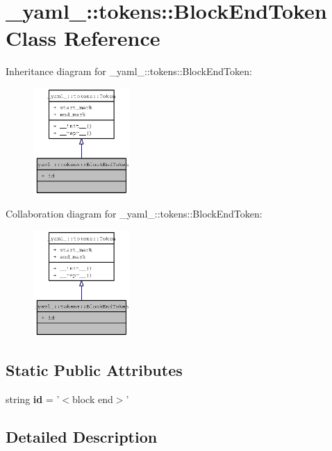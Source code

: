 \section{\_\-yaml\_\-::tokens::BlockEndToken Class Reference}
\label{class__yaml___1_1tokens_1_1BlockEndToken}
Inheritance diagram for \_\-yaml\_\-::tokens::BlockEndToken:\nopagebreak
\begin{figure}[H]
\begin{center}
\leavevmode
\includegraphics[width=104pt]{class__yaml___1_1tokens_1_1BlockEndToken__inherit__graph}
\end{center}
\end{figure}
Collaboration diagram for \_\-yaml\_\-::tokens::BlockEndToken:\nopagebreak
\begin{figure}[H]
\begin{center}
\leavevmode
\includegraphics[width=104pt]{class__yaml___1_1tokens_1_1BlockEndToken__coll__graph}
\end{center}
\end{figure}
\subsection*{Static Public Attributes}
\begin{CompactItemize}
\item 
string {\bf id} = '$<$block end$>$'
\end{CompactItemize}


\subsection{Detailed Description}


